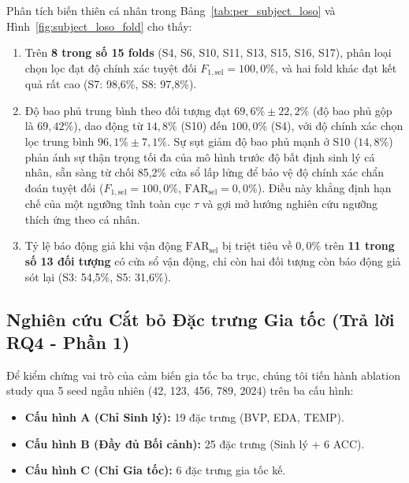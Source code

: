\documentclass[conference]{IEEEtran}
\begin{document}
Phân tích biến thiên cá nhân trong Bảng~\ref{tab:per_subject_loso} và Hình~\ref{fig:subject_loso_fold} cho thấy:
\begin{enumerate}
    \item Trên \textbf{8 trong số 15 folds} (S4, S6, S10, S11, S13, S15, S16, S17), phân loại chọn lọc đạt độ chính xác tuyệt đối $F_{1,\text{sel}} = 100,0\%$, và hai fold khác đạt kết quả rất cao (S7: 98,6\%, S8: 97,8\%).
    \item Độ bao phủ trung bình theo đối tượng đạt $69,6\% \pm 22,2\%$ (độ bao phủ gộp là $69,42\%$), dao động từ $14,8\%$ (S10) đến $100,0\%$ (S4), với độ chính xác chọn lọc trung bình $96,1\% \pm 7,1\%$. Sự sụt giảm độ bao phủ mạnh ở S10 ($14,8\%$) phản ánh sự thận trọng tối đa của mô hình trước độ bất định sinh lý cá nhân, sẵn sàng từ chối 85,2\% cửa sổ lấp lửng để bảo vệ độ chính xác chẩn đoán tuyệt đối ($F_{1,\text{sel}} = 100,0\%$, $\text{FAR}_{\text{sel}} = 0,0\%$). Điều này khẳng định hạn chế của một ngưỡng tĩnh toàn cục $\tau$ và gợi mở hướng nghiên cứu ngưỡng thích ứng theo cá nhân.
    \item Tỷ lệ báo động giả khi vận động $\text{FAR}_{\text{sel}}$ bị triệt tiêu về $0,0\%$ trên \textbf{11 trong số 13 đối tượng} có cửa sổ vận động, chỉ còn hai đối tượng còn báo động giả sót lại (S3: 54,5\%, S5: 31,6\%).
\end{enumerate}

\subsection{Nghiên cứu Cắt bỏ Đặc trưng Gia tốc (Trả lời RQ4 - Phần 1)}
Để kiểm chứng vai trò của cảm biến gia tốc ba trục, chúng tôi tiến hành ablation study qua 5 seed ngẫu nhiên (42, 123, 456, 789, 2024) trên ba cấu hình:
\begin{itemize}
    \item \textbf{Cấu hình A (Chỉ Sinh lý):} 19 đặc trưng (BVP, EDA, TEMP).
    \item \textbf{Cấu hình B (Đầy đủ Bối cảnh):} 25 đặc trưng (Sinh lý + 6 ACC).
    \item \textbf{Cấu hình C (Chỉ Gia tốc):} 6 đặc trưng gia tốc kế.
\end{itemize}
\end{document}
